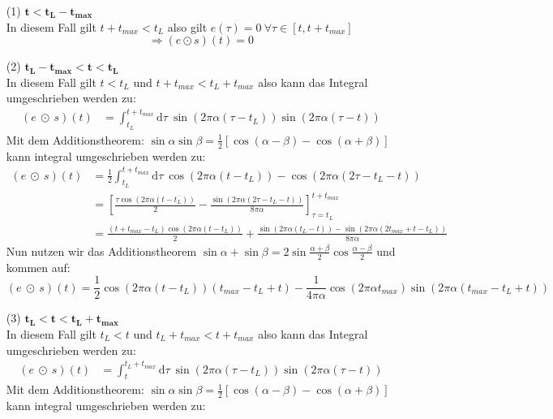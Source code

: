 \documentclass[ngerman]{scrartcl}
\begin{document}
\begin{itemize}
	\item [(1)] {$\mathbf{t<t_L-t_{max}}$}\\
	In diesem Fall gilt $t+t_{max}<t_L$
	also gilt $e(\tau)=0~\forall\tau\in[t,t+t_{max}]$
	\begin{equation*}
		\Rightarrow(e \odot s)(t)=0
	\end{equation*}
	\item [(2)] {$\mathbf{t_L-t_{max}<t<t_L}$}\\
	In diesem Fall gilt $t<t_L$ und $t+t_{max}<t_L+t_{max}$
	also kann das Integral umgeschrieben werden zu:
	\begin{align*}
		(e ~\odot~ s)(t)&=\int_{t_L}^{t+t_{max}} \mathrm{d} \tau~ \sin(2\pi\alpha(\tau-t_L)) \sin(2\pi\alpha(\tau-t))
	\end{align*}
	Mit dem Additionstheorem: $\sin \alpha \sin \beta = \frac{1}{2} \left[ \cos(\alpha-\beta) - \cos (\alpha+\beta) \right]$
	kann integral umgeschrieben werden zu:
	\begin{align*}
		(e ~\odot~ s)(t)&=\frac{1}{2}\int_{t_L}^{t+t_{max}} \mathrm{d} \tau~ \cos(2\pi\alpha(t-t_L))-\cos(2\pi\alpha(2\tau-t_L-t))\\
		&=\left[\frac{\tau\cos(2\pi\alpha(t-t_L))}{2}-\frac{\sin(2\pi\alpha(2\tau-t_L-t))}{8\pi\alpha}\right]_{\tau=t_L}^{t+t_{max}}\\
		&=\frac{(t+t_{max}-t_L)\cos(2\pi\alpha(t-t_L))}{2}+\frac{\sin(2\pi\alpha(t_L-t))-\sin(2\pi\alpha(2t_{max}+t-t_L))}{8\pi\alpha}
	\end{align*}
	Nun nutzen wir das Additionstheorem $\sin \alpha +\sin \beta = 2 \sin \frac{\alpha + \beta}{2} \cos \frac{\alpha - \beta}{2}$ und kommen auf:
	\begin{equation*}
		(e ~\odot~ s)(t)=\frac{1}{2}\cos(2\pi\alpha(t-t_L))(t_{max}-t_L+t)-\frac{1}{4\pi\alpha}\cos(2\pi\alpha t_{max})\sin(2\pi\alpha(t_{max}-t_L+t))
	\end{equation*}
	\item [(3)] {$\mathbf{t_L<t<t_L+t_{max}}$}\\
	In diesem Fall gilt $t_L<t$ und $t_L+t_{max}<t+t_{max}$
	also kann das Integral umgeschrieben werden zu:
	\begin{align*}
		(e ~\odot~ s)(t)&=\int_{t}^{t_L+t_{max}} \mathrm{d} \tau~ \sin(2\pi\alpha(\tau-t_L)) \sin(2\pi\alpha(\tau-t))
	\end{align*}
	Mit dem Additionstheorem: $\sin \alpha \sin \beta = \frac{1}{2} \left[ \cos(\alpha-\beta) - \cos (\alpha+\beta) \right]$
	kann integral umgeschrieben werden zu:

\end{itemize}
\end{document}
